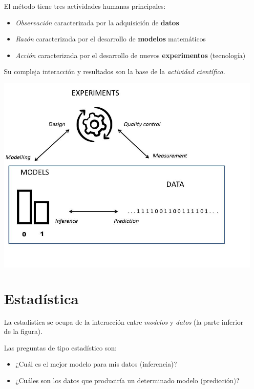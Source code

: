 \documentclass[
]{book}
\providecommand{\tightlist}{%
  \setlength{\itemsep}{0pt}\setlength{\parskip}{0pt}}
\begin{document}
El método tiene tres actividades humanas principales:

\begin{itemize}
\tightlist
\item
  \emph{Observación} caracterizada por la adquisición de \textbf{datos}
\item
  \emph{Razón} caracterizada por el desarrollo de \textbf{modelos} matemáticos
\item
  \emph{Acción} caracterizada por el desarrollo de nuevos \textbf{experimentos} (tecnología)
\end{itemize}

Su compleja interacción y resultados son la base de la \emph{actividad científica}.

\includegraphics{./figures/stats.JPG}

\hypertarget{estaduxedstica}{%
\section{Estadística}\label{estaduxedstica}}

La estadística se ocupa de la interacción entre \emph{modelos} y \emph{datos} (la parte inferior de la figura).

Las preguntas de tipo estadístico son:

\begin{itemize}
\tightlist
\item
  ¿Cuál es el mejor modelo para mis datos (inferencia)?
\item
  ¿Cuáles son los datos que produciría un determinado modelo (predicción)?
\end{itemize}
\end{document}
